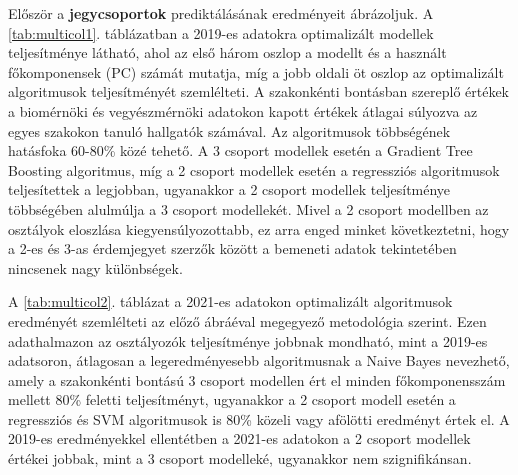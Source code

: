 \documentclass[12pt]{article}
\begin{document}
Először a \textbf{jegycsoportok} prediktálásának eredményeit ábrázoljuk. A \ref{tab:multicol1}. táblázatban a 2019-es adatokra optimalizált modellek teljesítménye látható, ahol az első három oszlop a modellt és a használt főkomponensek (PC) számát mutatja, míg a jobb oldali öt oszlop az optimalizált algoritmusok teljesítményét szemlélteti. A szakonkénti bontásban szereplő értékek a biomérnöki és vegyészmérnöki adatokon kapott értékek átlagai súlyozva az egyes szakokon tanuló hallgatók számával. Az algoritmusok többségének hatásfoka 60-80\% közé tehető. A 3 csoport modellek esetén a Gradient Tree Boosting algoritmus, míg a 2 csoport modellek esetén a regressziós algoritmusok teljesítettek a legjobban, ugyanakkor a 2 csoport modellek teljesítménye többségében alulmúlja a 3 csoport modellekét. Mivel a 2 csoport modellben az osztályok eloszlása kiegyensúlyozottabb, ez arra enged minket következtetni, hogy a 2-es és 3-as érdemjegyet szerzők között a bemeneti adatok tekintetében nincsenek nagy különbségek.

A \ref{tab:multicol2}. táblázat a 2021-es adatokon optimalizált algoritmusok eredményét szemlélteti az előző ábráéval megegyező metodológia szerint. Ezen adathalmazon az osztályozók teljesítménye jobbnak mondható, mint a 2019-es adatsoron, átlagosan a legeredményesebb algoritmusnak a Naive Bayes nevezhető, amely a szakonkénti bontású 3 csoport modellen ért el minden főkomponensszám mellett 80\% feletti teljesítményt, ugyanakkor a 2 csoport modell esetén a regressziós és SVM algoritmusok is 80\% közeli vagy afölötti eredményt értek el. A 2019-es eredményekkel ellentétben a 2021-es adatokon a 2 csoport modellek értékei jobbak, mint a 3 csoport modelleké, ugyanakkor nem szignifikánsan.
\end{document}
